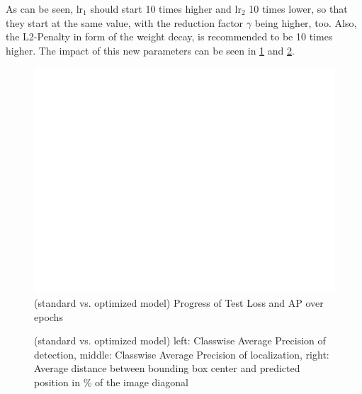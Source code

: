 As can be seen, lr$_1$ should start 10 times higher and lr$_2$ 10 times lower, so that they start at the same value, with the reduction factor $\gamma$ being higher, too. Also, the L2-Penalty in form of the weight decay, is recommended to be 10 times higher. The impact of this new parameters can be seen in \ref{fig:gp_aps} and \ref{fig:gp_distances}.

\begin{figure}[h]
	\centering
	\includegraphics[width=15cm]{4_experiments/images/0_GP_exp/APs.pdf}
	\caption{(standard vs. optimized model) Progress of Test Loss and AP over epochs}
	\label{fig:gp_aps}
\end{figure}

\begin{figure}[h]
	\centering
\caption{(standard vs. optimized model) left: Classwise Average Precision of detection, middle: Classwise Average Precision of localization, right: Average distance between bounding box center and predicted position in \% of the image diagonal}
\label{fig:gp_distances}
\end{figure}

